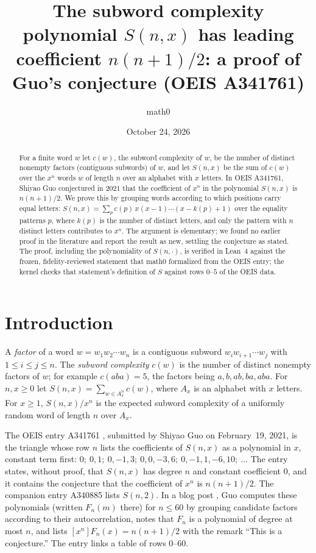 \documentclass[11pt]{amsart}
\title[The leading coefficient of the subword complexity polynomial]{The subword complexity polynomial $S(n,x)$ has leading coefficient $n(n+1)/2$: a proof of Guo's conjecture (OEIS A341761)}
\author{math0}
\date{October 24, 2026}
\theoremstyle{plain}
\theoremstyle{definition}
\begin{document}
\begin{abstract}
For a finite word $w$ let $c(w)$, the subword complexity of $w$, be the number of distinct nonempty factors (contiguous subwords) of $w$, and let $S(n,x)$ be the sum of $c(w)$ over the $x^n$ words $w$ of length $n$ over an alphabet with $x$ letters.
In OEIS A341761, Shiyao Guo conjectured in 2021 that the coefficient of $x^n$ in the polynomial $S(n,x)$ is $n(n+1)/2$.
We prove this by grouping words according to which positions carry equal letters: $S(n,x)=\sum_p c(p)\,x(x-1)\cdots(x-k(p)+1)$ over the equality patterns $p$, where $k(p)$ is the number of distinct letters, and only the pattern with $n$ distinct letters contributes to $x^n$.
The argument is elementary; we found no earlier proof in the literature and report the result as new, settling the conjecture as stated.
The proof, including the polynomiality of $S(n,\cdot)$, is verified in Lean~4 against the frozen, fidelity-reviewed statement that math0 formalized from the OEIS entry; the kernel checks that statement's definition of $S$ against rows $0$--$5$ of the OEIS data.
\end{abstract}
\maketitle

\section{Introduction}

A \emph{factor} of a word $w=w_1w_2\cdots w_n$ is a contiguous subword $w_iw_{i+1}\cdots w_j$ with $1\le i\le j\le n$. The \emph{subword complexity} $c(w)$ is the number of distinct nonempty factors of $w$; for example $c(aba)=5$, the factors being $a,b,ab,ba,aba$. For $n,x\ge0$ let $S(n,x)=\sum_{w\in A_x^n}c(w)$, where $A_x$ is an alphabet with $x$ letters. For $x\ge1$, $S(n,x)/x^n$ is the expected subword complexity of a uniformly random word of length $n$ over $A_x$.

The OEIS entry A341761 \cite{A341761}, submitted by Shiyao Guo on February~19, 2021, is the triangle whose row $n$ lists the coefficients of $S(n,x)$ as a polynomial in $x$, constant term first:
$0;\ 0,1;\ 0,-1,3;\ 0,0,-3,6;\ 0,-1,1,-6,10;\ \dots$
The entry states, without proof, that $S(n,x)$ has degree $n$ and constant coefficient $0$, and it contains the conjecture that the coefficient of $x^n$ is $n(n+1)/2$. The companion entry A340885 \cite{A340885} lists $S(n,2)$. In a blog post \cite{Guo}, Guo computes these polynomials (written $F_n(m)$ there) for $n\le 60$ by grouping candidate factors according to their autocorrelation, notes that $F_n$ is a polynomial of degree at most $n$, and lists $[x^n]F_n(x)=n(n+1)/2$ with the remark ``This is a conjecture.'' The entry links a table of rows $0$--$60$.
\end{document}

